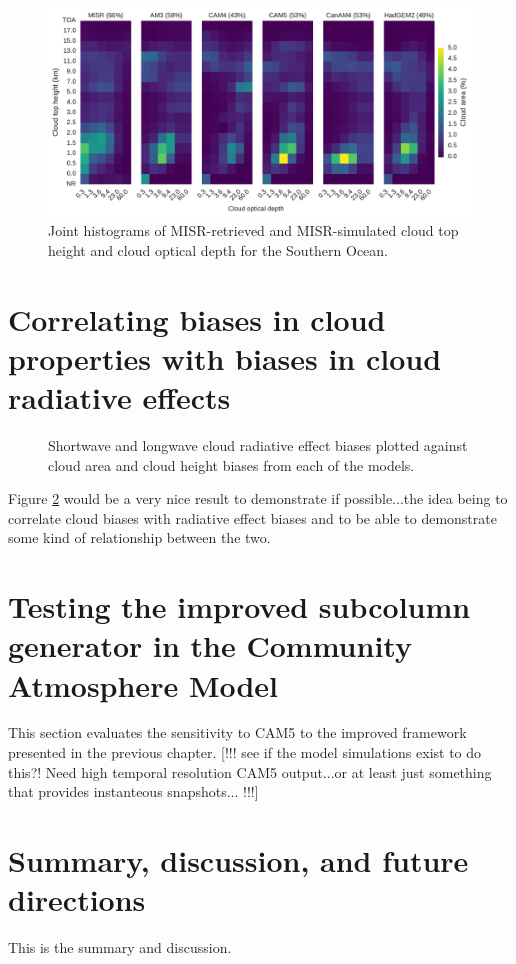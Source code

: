 \begin{figure}
\centering
\includegraphics[width=\columnwidth]{graphics/cmip5_clMISR_SouthernOcean.pdf}
\caption{Joint histograms of MISR-retrieved and MISR-simulated cloud top height and cloud optical depth for the Southern Ocean.}
\label{cmip5_clMISR_SouthernOcean}
\end{figure}

\section{Correlating biases in cloud properties with biases in cloud radiative effects}
\begin{figure}
\centering
\caption{Shortwave and longwave cloud radiative effect biases plotted against cloud area and cloud height biases from each of the models.}
\label{cmip5_biases_correlation}
\end{figure}
Figure \ref{cmip5_biases_correlation} would be a very nice result to demonstrate if possible...the idea being to correlate cloud biases with radiative effect biases and to be able to demonstrate some kind of relationship between the two.

\section{Testing the improved subcolumn generator in the Community Atmosphere Model}
This section evaluates the sensitivity to CAM5 to the improved framework presented in the previous chapter. [!!! see if the model simulations exist to do this?! Need high temporal resolution CAM5 output...or at least just something that provides instanteous snapshots... !!!]

\section{Summary, discussion, and future directions}
This is the summary and discussion.
